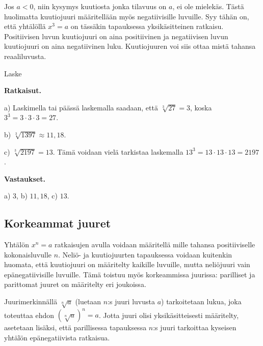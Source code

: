 
Jos $a<0$, niin kysymys kuutiosta jonka tilavuus on $a$, ei ole mielekäs. Tästä huolimatta kuutiojuuri määritellään myös negatiivisille luvuille. Syy tähän on, että yhtälöllä $x^3=a$ on tässäkin tapauksessa yksikäsitteinen ratkaisu. Positiivisen luvun kuutiojuuri on aina positiivinen ja negatiivisen luvun kuutiojuuri on aina negatiivinen luku. Kuutiojuuren voi siis ottaa mistä tahansa reaaliluvusta.


\begin{esimerkki}
Laske
\begin{alakohdat}


\end{alakohdat}

{\bf Ratkaisut.}

a)
Laskimella tai päässä laskemalla saadaan, että $\sqrt[3]{27} = 3$, koska  $3^3 =3\cdot 3\cdot 3=27$.

b) 
$\sqrt[3]{1397}\approx 11,18$. 

c)
$\sqrt[3]{2197}=13$.
Tämä voidaan vielä tarkistaa laskemalla $13^3 = 13\cdot 13\cdot 13=2197$.

{\bf Vastaukset.}

a) $3$, b) $11,18$, c) $13$.
\end{esimerkki}


\subsection*{Korkeammat juuret}


Yhtälön $x^n=a$ ratkaisujen avulla voidaan määritellä   mille tahansa positiiviselle kokonaisluvulle $n$. Neliö- ja kuutiojuurten tapauksessa voidaan kuitenkin huomata, että kuutiojuuri on määritelty kaikille luvuille, mutta neliöjuuri vain epänegatiivisille luvuille. Tämä toistuu myös korkeammissa juurissa: parilliset ja parittomat juuret on määritelty eri joukoissa.

Juurimerkinnällä $\sqrt[n]{a}$ (luetaan $n$:s juuri luvusta $a$) tarkoitetaan lukua, joka toteuttaa ehdon $(\sqrt[n]{a})^n = a$. Jotta juuri olisi yksikäsitteisesti määritelty, asetetaan lisäksi, että parillisessa tapauksessa $n$:s juuri tarkoittaa kyseisen yhtälön epänegatiivista ratkaisua.



